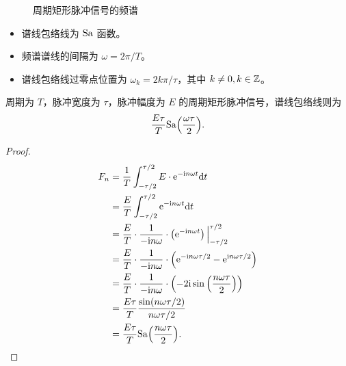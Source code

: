 \begin{example}[周期矩形脉冲信号的傅里叶级数]
\begin{figure}[H]
        \caption{周期矩形脉冲信号的频谱}
        \label{fig:periodic-rect-pulse-signal-freq}
    \end{figure}

    \begin{itemize}
        \item 谱线包络线为 $\mathrm{Sa}$ 函数。
        \item 频谱谱线的间隔为 $\omega = 2\pi / T$。
        \item 谱线包络线过零点位置为 $\omega_k = 2k\pi / \tau$，其中 $k \neq 0, k \in \mathbb{Z}$。
    \end{itemize}
\end{example}

\begin{theorem}
    周期为 $T$，脉冲宽度为 $\tau$，脉冲幅度为 $E$ 的周期矩形脉冲信号，谱线包络线则为
    \begin{align*}
        \frac{E\tau}{T}\mathrm{Sa}{\left(\frac{\omega\tau}{2}\right)}.
    \end{align*}
\end{theorem}

\begin{proof}
    \begin{align*}
        F_n & = \frac{1}{T}\int_{-\tau/2}^{\tau/2}E\cdot \mathrm{e}^{-\mathrm{i} n\omega t}\mathrm{d}t \\
        & = \frac{E}{T}\int_{-\tau/2}^{\tau/2}\mathrm{e}^{-\mathrm{i} n\omega t}\mathrm{d}t \\
        & = \frac{E}{T}\cdot\frac{1}{-\mathrm{i} n\omega}\cdot\left(\mathrm{e}^{-\mathrm{i} n\omega t}\right)\Big|_{-\tau/2}^{\tau/2} \\
        & = \frac{E}{T}\cdot\frac{1}{-\mathrm{i} n\omega}\cdot\left(\mathrm{e}^{-\mathrm{i} n\omega \tau / 2} - \mathrm{e}^{\mathrm{i} n \omega \tau /2 }\right) \\
        & = \frac{E}{T}\cdot\frac{1}{-\mathrm{i} n\omega}\cdot\left(-2\mathrm{i}\sin\left(\frac{n\omega\tau}{2}\right)\right) \\
        & = \frac{E\tau}{T}\frac{\sin(n\omega\tau/2)}{n\omega\tau/2} \\
        & = \frac{E\tau}{T}\mathrm{Sa}{\left(\frac{n\omega\tau}{2}\right)}.
    \end{align*}
\end{proof}

